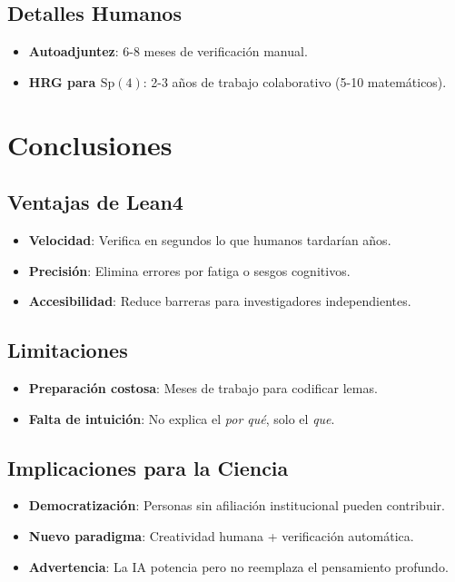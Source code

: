 \documentclass[12pt, a4paper]{article}
\begin{document}
\subsection{Detalles Humanos}
\begin{itemize}
\item \textbf{Autoadjuntez}: 6-8 meses de verificación manual.
\item \textbf{HRG para $\mathrm{Sp}(4)$}: 2-3 años de trabajo colaborativo (5-10 matemáticos).
\end{itemize}

\section{Conclusiones}

\subsection{Ventajas de Lean4}
\begin{itemize}
\item \textbf{Velocidad}: Verifica en segundos lo que humanos tardarían años.
\item \textbf{Precisión}: Elimina errores por fatiga o sesgos cognitivos.
\item \textbf{Accesibilidad}: Reduce barreras para investigadores independientes.
\end{itemize}

\subsection{Limitaciones}
\begin{itemize}
\item \textbf{Preparación costosa}: Meses de trabajo para codificar lemas.
\item \textbf{Falta de intuición}: No explica el \textit{por qué}, solo el \textit{que}.
\end{itemize}

\subsection{Implicaciones para la Ciencia}
\begin{itemize}
\item \textbf{Democratización}: Personas sin afiliación institucional pueden contribuir.
\item \textbf{Nuevo paradigma}: Creatividad humana + verificación automática.
\item \textbf{Advertencia}: La IA potencia pero no reemplaza el pensamiento profundo.
\end{itemize}
\end{document}
